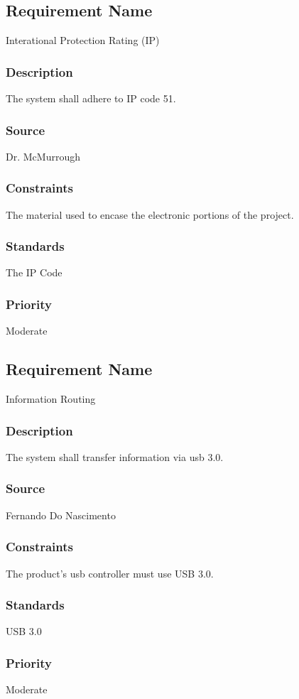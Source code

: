 \subsection{Requirement Name}
Interational Protection Rating (IP)
\subsubsection{Description}
The system shall adhere to IP code 51.
\subsubsection{Source}
Dr. McMurrough
\subsubsection{Constraints}
The material used to encase the electronic portions of the project.
\subsubsection{Standards}
The IP Code
\subsubsection{Priority}
Moderate

\subsection{Requirement Name}
Information Routing
\subsubsection{Description}
The system shall transfer information via usb 3.0.
\subsubsection{Source}
Fernando Do Nascimento
\subsubsection{Constraints}
The product's usb controller must use USB 3.0.
\subsubsection{Standards}
USB 3.0
\subsubsection{Priority}
Moderate
